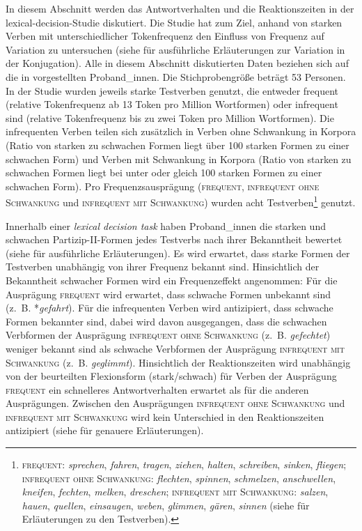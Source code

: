 In diesem Abschnitt werden das Antwortverhalten und die Reaktionszeiten in der lexical-decision-Studie diskutiert. Die Studie hat zum Ziel, anhand von starken Verben mit unterschiedlicher Tokenfrequenz den Einfluss von Frequenz auf Variation zu untersuchen (siehe  für ausführliche Erläuterungen zur Variation in der Konjugation). Alle in diesem Abschnitt diskutierten Daten beziehen sich auf die in  vorgestellten Proband\_innen. Die Stichprobengröße beträgt 53 Personen. In der Studie wurden jeweils starke Testverben genutzt, die entweder frequent (relative Tokenfrequenz ab 13 Token pro Million Wortformen) oder infrequent sind (relative Tokenfrequenz bis zu zwei Token pro Million Wortformen). Die infrequenten Verben teilen sich zusätzlich in Verben ohne Schwankung in Korpora (Ratio von starken zu schwachen Formen liegt über 100 starken Formen zu einer schwachen Form) und Verben mit Schwankung in Korpora (Ratio von starken zu schwachen Formen liegt bei unter oder gleich 100 starken Formen zu einer schwachen Form). Pro Frequenzsausprägung (\textsc{frequent}, \textsc{infrequent ohne Schwankung} und \textsc{infrequent mit Schwankung}) wurden acht Testverben\footnote{\textsc{frequent}: \textit{sprechen}, \textit{fahren}, \textit{tragen}, \textit{ziehen}, \textit{halten}, \textit{schreiben}, \textit{sinken}, \textit{fliegen}; \textsc{infrequent ohne Schwankung}: \textit{flechten}, \textit{spinnen}, \textit{schmelzen}, \textit{anschwellen}, \textit{kneifen}, \textit{fechten}, \textit{melken}, \textit{dreschen}; \textsc{infrequent mit Schwankung}: \textit{salzen}, \textit{hauen}, \textit{quellen}, \textit{einsaugen}, \textit{weben}, \textit{glimmen}, \textit{gären}, \textit{sinnen} (siehe  für Erläuterungen zu den Testverben).} genutzt.

\begin{sloppypar}
Innerhalb einer \textit{lexical decision task} haben Proband\_innen die starken und schwachen Par\-ti\-zip-II-Formen jedes Testverbs nach ihrer Bekanntheit bewertet (siehe  für ausführliche Erläuterungen). Es wird erwartet, dass starke Formen der Testverben unabhängig von ihrer Frequenz bekannt sind. Hinsichtlich der Bekanntheit schwacher Formen wird ein Frequenzeffekt angenommen: Für die Ausprägung \textsc{frequent} wird erwartet, dass schwache Formen unbekannt sind (z.~B. *\textit{gefahrt}). Für die infrequenten Verben wird antizipiert, dass schwache Formen bekannter sind, dabei wird davon ausgegangen, dass die schwachen Verbformen der Ausprägung \textsc{infrequent ohne Schwankung} (z.~B. \textit{gefechtet}) weniger bekannt sind als schwache Verbformen der Ausprägung \textsc{infrequent mit Schwankung} (z.~B. \textit{geglimmt}). Hinsichtlich der Reaktionszeiten wird unabhängig von der beurteilten Flexionsform (stark/schwach) für Verben der Ausprägung \textsc{frequent} ein schnelleres Antwortverhalten erwartet als für die anderen Ausprägungen. Zwischen den Ausprägungen \textsc{infrequent ohne Schwankung} und \textsc{infrequent mit Schwankung} wird kein Unterschied in den Reak\-tions\-zeiten antizipiert (siehe  für genauere Erläuterungen).
\end{sloppypar}

